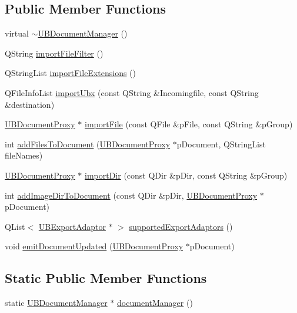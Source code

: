 \subsection*{Public Member Functions}
\begin{DoxyCompactItemize}
\item 
virtual \hyperlink{class_u_b_document_manager_a11e474c8d207ed9b623dc547219472d5}{$\sim$\-U\-B\-Document\-Manager} ()
\item 
Q\-String \hyperlink{class_u_b_document_manager_a9dc5642a7235cf9a9222d38a6b496c74}{import\-File\-Filter} ()
\item 
Q\-String\-List \hyperlink{class_u_b_document_manager_a1be6b4a8b1a80c9baa4931ff68e50373}{import\-File\-Extensions} ()
\item 
Q\-File\-Info\-List \hyperlink{class_u_b_document_manager_a4bb8d2901316ff82dbddc600414bd616}{import\-Ubx} (const Q\-String \&Incomingfile, const Q\-String \&destination)
\item 
\hyperlink{class_u_b_document_proxy}{U\-B\-Document\-Proxy} $\ast$ \hyperlink{class_u_b_document_manager_aaa0b883c0aa4ae465e63df9af25fed1e}{import\-File} (const Q\-File \&p\-File, const Q\-String \&p\-Group)
\item 
int \hyperlink{class_u_b_document_manager_abd34b528df41737caedf2dd6e0661dd7}{add\-Files\-To\-Document} (\hyperlink{class_u_b_document_proxy}{U\-B\-Document\-Proxy} $\ast$p\-Document, Q\-String\-List file\-Names)
\item 
\hyperlink{class_u_b_document_proxy}{U\-B\-Document\-Proxy} $\ast$ \hyperlink{class_u_b_document_manager_a591b5c0ee721873fbcca06d26ce4e2fb}{import\-Dir} (const Q\-Dir \&p\-Dir, const Q\-String \&p\-Group)
\item 
int \hyperlink{class_u_b_document_manager_a19868e49fb0bb331ba2f26c28f01f02e}{add\-Image\-Dir\-To\-Document} (const Q\-Dir \&p\-Dir, \hyperlink{class_u_b_document_proxy}{U\-B\-Document\-Proxy} $\ast$p\-Document)
\item 
Q\-List$<$ \hyperlink{class_u_b_export_adaptor}{U\-B\-Export\-Adaptor} $\ast$ $>$ \hyperlink{class_u_b_document_manager_aa3dcc18dae4cb2b64c7af2c7c3122ee5}{supported\-Export\-Adaptors} ()
\item 
void \hyperlink{class_u_b_document_manager_af14733ff65800757f9ce8fcd8ae965b1}{emit\-Document\-Updated} (\hyperlink{class_u_b_document_proxy}{U\-B\-Document\-Proxy} $\ast$p\-Document)
\end{DoxyCompactItemize}
\subsection*{Static Public Member Functions}
\begin{DoxyCompactItemize}
\item 
static \hyperlink{class_u_b_document_manager}{U\-B\-Document\-Manager} $\ast$ \hyperlink{class_u_b_document_manager_a76098e4be543e87a5fc05c6d471a2670}{document\-Manager} ()
\end{DoxyCompactItemize}


